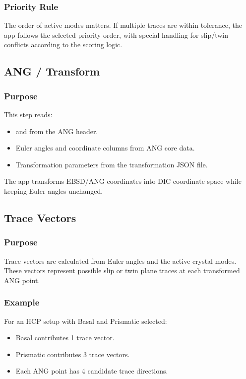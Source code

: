 \documentclass[11pt]{article}
\newcommand{\code}[1]{\texttt{\detokenize{#1}}}
\begin{document}
\subsubsection{Priority Rule}

The order of active modes matters. If multiple traces are within tolerance, the app follows the selected priority order, with special handling for slip/twin conflicts according to the scoring logic.

\subsection{ANG / Transform}

\subsubsection{Purpose}

This step reads:

\begin{itemize}
    \item \code{XSTEP} and \code{YSTEP} from the ANG header.
    \item Euler angles and coordinate columns from ANG core data.
    \item Transformation parameters from the transformation JSON file.
\end{itemize}

The app transforms EBSD/ANG coordinates into DIC coordinate space while keeping Euler angles unchanged.

\subsection{Trace Vectors}

\subsubsection{Purpose}

Trace vectors are calculated from Euler angles and the active crystal modes. These vectors represent possible slip or twin plane traces at each transformed ANG point.

\subsubsection{Example}

For an HCP setup with Basal and Prismatic selected:

\begin{itemize}
    \item Basal contributes 1 trace vector.
    \item Prismatic contributes 3 trace vectors.
    \item Each ANG point has 4 candidate trace directions.
\end{itemize}
\end{document}

